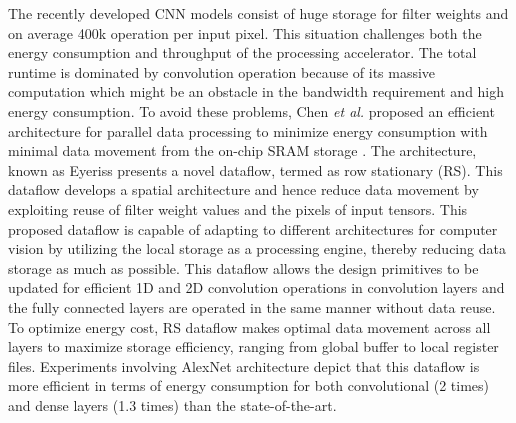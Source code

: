 \documentclass[journal]{IEEEtran}
\begin{document}
\par The recently developed CNN models consist of huge storage for filter weights and on average 400k operation per input pixel. This situation challenges both the energy consumption and throughput of the processing accelerator. The total runtime is dominated by convolution operation because of its massive computation which might be an obstacle in the bandwidth requirement and high energy consumption. To avoid these problems, Chen \textit{et al.} proposed an efficient architecture for parallel data processing to minimize energy consumption with minimal data movement from the on-chip SRAM storage \cite{paper25}. The architecture, known as Eyeriss presents a novel dataflow, termed as row stationary (RS). This dataflow develops a spatial architecture and hence reduce data movement by exploiting reuse of filter weight values and the pixels of input tensors. This proposed dataflow is capable of adapting to different architectures for computer vision by utilizing the local storage as a processing engine, thereby reducing data storage as much as possible. This dataflow allows the design primitives to be updated for efficient 1D and 2D convolution operations in convolution layers and the fully connected layers are operated in the same manner without data reuse. To optimize energy cost, RS dataflow makes optimal data movement across all layers to maximize storage efficiency, ranging from global buffer to local register files. Experiments involving AlexNet architecture \cite{paper6} depict that this dataflow is more efficient in terms of energy consumption for both convolutional (2 times) and dense layers (1.3 times) than the state-of-the-art. 
\end{document}
